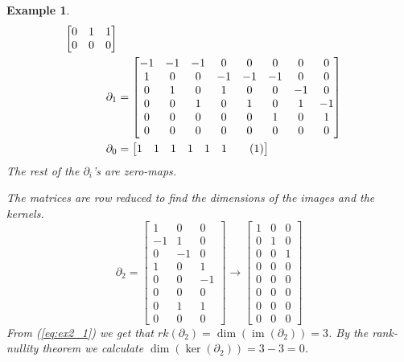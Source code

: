 \documentclass[11pt,a4paper,twoside]{report}
\newtheorem{myex}[mythm]{Example}
\newcommand\numberthis{\addtocounter{equation}{1}\tag{\theequation}}
\DeclareMathOperator{\im}{im}
\begin{document}
\begin{myex}
\begin{align*}
\begin{bmatrix}
0 & 1 & 1 \\
0 & 0 & 0 
\end{bmatrix}
\\
\partial_1&=
\begin{bmatrix}
-1 & -1 & -1 & 0 & 0 & 0 & 0 & 0 \\
1 & 0 & 0 & -1 & -1 & -1 & 0 & 0 \\
0 & 1 & 0 & 1 & 0 & 0 & -1 & 0 \\
0 & 0 & 1 & 0 & 1 & 0 & 1 & -1 \\
0 & 0 & 0 & 0 & 0 & 1 & 0 & 1 \\
0 & 0 & 0 & 0 & 0 & 0 & 0 & 0 
\end{bmatrix}
\\
\partial_0&=
\begin{bmatrix}
1 & 1 & 1 & 1 & 1 & 1 \numberthis \label{eq:ex2_0}
\end{bmatrix}
\end{align*} 
The rest of the $\partial_i$'s are zero-maps.

The matrices are row reduced to find the dimensions of the images and the kernels.
\begin{equation}\label{eq:ex2_1}
\partial_2=
\begin{bmatrix}
1 & 0 & 0 \\
-1 & 1 & 0 \\
0 & -1 & 0 \\
1 & 0 & 1 \\
0 & 0 & -1 \\
0 & 0 & 0 \\
0 & 1 & 1 \\
0 & 0 & 0 
\end{bmatrix}
\to
\begin{bmatrix}
1 & 0 & 0 \\
0 & 1 & 0 \\
0 & 0 & 1 \\
0 & 0 & 0 \\
0 & 0 & 0 \\
0 & 0 & 0 \\
0 & 0 & 0 \\
0 & 0 & 0 
\end{bmatrix}
\end{equation}
From (\ref{eq:ex2_1}) we get that $rk(\partial_2)=\dim(\im(\partial_2))=3$. By the rank-nullity theorem we calculate $\dim(\ker(\partial_2))=3-3=0$.


\end{myex}
\end{document}
